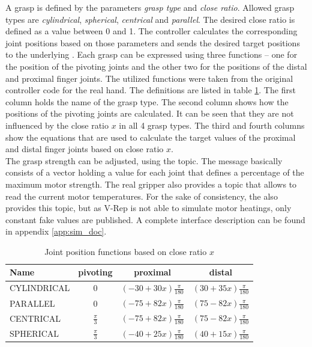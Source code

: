 A grasp is defined by the parameters \emph{grasp type} and \emph{close ratio}. Allowed grasp types are \emph{cylindrical}, \emph{spherical}, \emph{centrical} and \emph{parallel}. The desired close ratio is defined as a value between 0 and 1. The controller calculates the corresponding joint positions based on those parameters and sends the desired target positions to the underlying . Each grasp can be expressed using three functions -- one for the position of the pivoting joints and the other two for the positions of the distal and proximal finger joints. The utilized functions were taken from the original controller code for the real hand. The definitions are listed in table \ref{fig:grasp_defs}. The first column holds the name of the grasp type. The second column shows how the positions of the pivoting joints are calculated. It can be seen that they are not influenced by the close ratio $x$ in all 4 grasp types. The third and fourth columns show the equations that are used to calculate the target values of the proximal and distal finger joints based on close ratio $x$. \\

The grasp strength can be adjusted, using the  topic. The message basically consists of a vector holding a value for each joint that defines a percentage of the maximum motor strength. The real gripper also provides a topic that allows to read the current motor temperatures. For the sake of consistency, the  also provides this topic, but as V-Rep is not able to simulate motor heatings, only constant fake values are published. A complete interface description can be found in appendix \ref{app:sim_doc}.

\begin{table}[h]
  \centering
  \begin{tabular}{|l|c|c|c|} \hline
	\textbf{Name} & \textbf{pivoting} & \textbf{proximal} & \textbf{distal} \\ \hline
	CYLINDRICAL & $0$ & $(-30+30x)\frac{\pi}{180}$ & $(30 + 35x)\frac{\pi}{180}$ \\
	PARALLEL & $0$ & $(-75+82x)\frac{\pi}{180}$ & $(75-82x)\frac{\pi}{180}$ \\
	CENTRICAL & $\frac{\pi}{3}$ & $(-75+82x)\frac{\pi}{180}$ & $(75-82x)\frac{\pi}{180}$ \\
	SPHERICAL & $\frac{\pi}{3}$ & $(-40+25x)\frac{\pi}{180}$ & $(40+15x)\frac{\pi}{180}$ \\ \hline
  \end{tabular}
  \caption{Joint position functions based on close ratio $x$}
  \label{fig:grasp_defs}
\end{table}

